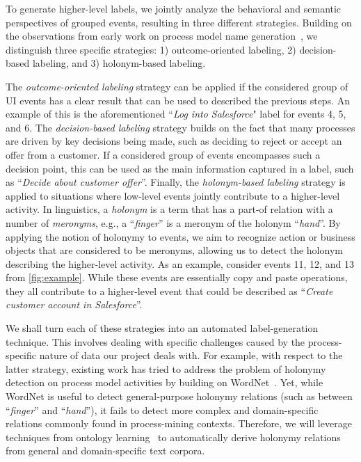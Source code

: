 
 To generate higher-level labels, we jointly analyze the behavioral and semantic perspectives of grouped events, resulting in three different strategies. Building on the observations from early work on process model name generation~\cite{leopold2014simplifying}, we distinguish three specific strategies: 1) outcome-oriented labeling, 2) decision-based labeling, and 3) holonym-based labeling. 

The \textit{outcome-oriented labeling} strategy can be applied if the considered group of UI events has a clear result that can be used to described the previous steps. An example of this is the aforementioned ``\textit{Log into Salesforce}" label for events 4, 5, and 6.
%
The \textit{decision-based labeling} strategy builds on the fact that many processes are driven by key decisions being made, such as deciding to reject or accept an offer from a customer. If a considered group of events encompasses such a decision point, this can be used as the main information captured in a label, such as ``\textit{Decide about customer offer}''. 
%
Finally, the \textit{holonym-based labeling} strategy is applied to situations where low-level events jointly contribute to a higher-level activity. In linguistics, a \textit{holonym} is a term that has a part-of relation with a number of \textit{meronyms}, e.g., a ``\textit{finger}'' is a meronym of the holonym ``\textit{hand}''.
By applying the notion of holonymy to events, we aim to recognize action or business objects that are considered to be meronyms, allowing us to detect the holonym describing the higher-level activity. As an example, consider events 11, 12, and 13 from \autoref{fig:example}. While these events are essentially copy and paste operations, they all contribute to a higher-level event that could be described as ``\textit{Create customer account in Salesforce}''. 

We shall turn each of these strategies into an automated label-generation technique. This involves dealing with specific challenges caused by the process-specific nature of data our project deals with. For example, with respect to the latter strategy, existing work has tried to address the problem of holonymy detection on process model activities by building on WordNet~\cite{leopold2014simplifying}. Yet, while WordNet is useful to detect general-purpose holonymy relations (such as between ``\textit{finger}'' and ``\textit{hand}''), it fails to detect more complex and domain-specific relations commonly found in process-mining contexts. Therefore, we will leverage techniques from ontology learning~\cite{al2020automatic,wong2012ontology} to automatically derive holonymy relations from general and domain-specific text corpora.    

